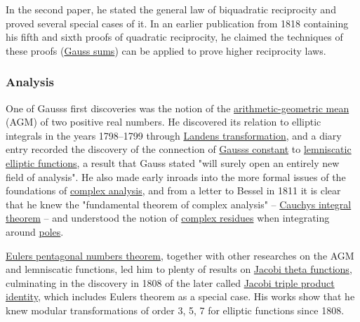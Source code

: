 In the second paper, he stated the general law of biquadratic reciprocity and proved several special cases of it. In an earlier publication from 1818 containing his fifth and sixth proofs of quadratic reciprocity, he claimed the techniques of these proofs (\href{https://en.wikipedia.org/wiki/Gauss_sum}{Gauss sums}) can be applied to prove higher reciprocity laws.


\subsubsection{Analysis}\label{Analysis}

One of Gauss\textquotesingle s first discoveries was the notion of the \href{https://en.wikipedia.org/wiki/Arithmetic-geometric_mean}{arithmetic-geometric mean} (AGM) of two positive real numbers. He discovered its relation to elliptic integrals in the years 1798--1799 through \href{https://en.wikipedia.org/wiki/Landen's_transformation}{Landen\textquotesingle s transformation}, and a diary entry recorded the discovery of the connection of \href{https://en.wikipedia.org/wiki/Gauss's_constant}{Gauss\textquotesingle s constant} to \href{https://en.wikipedia.org/wiki/Lemniscatic_elliptic_functions}{lemniscatic elliptic functions}, a result that Gauss stated "will surely open an entirely new field of analysis". He also made early inroads into the more formal issues of the foundations of \href{https://en.wikipedia.org/wiki/Complex_analysis}{complex analysis}, and from a letter to Bessel in 1811 it is clear that he knew the "fundamental theorem of complex analysis" -- \href{https://en.wikipedia.org/wiki/Cauchy's_integral_theorem}{Cauchy\textquotesingle s integral theorem} -- and understood the notion of \href{https://en.wikipedia.org/wiki/Residue_(complex_analysis)}{complex residues} when integrating around \href{https://en.wikipedia.org/wiki/Pole_(complex_analysis)}{poles}.

\href{https://en.wikipedia.org/wiki/Pentagonal_number_theorem}{Euler\textquotesingle s pentagonal numbers theorem}, together with other researches on the AGM and lemniscatic functions, led him to plenty of results on \href{https://en.wikipedia.org/wiki/Jacobi_theta_functions}{Jacobi theta functions}, culminating in the discovery in 1808 of the later called \href{https://en.wikipedia.org/wiki/Jacobi_triple_product_identity}{Jacobi triple product identity}, which includes Euler\textquotesingle s theorem as a special case. His works show that he knew modular transformations of order 3, 5, 7 for elliptic functions since 1808.

